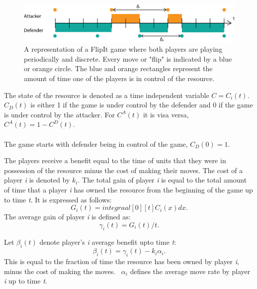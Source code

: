\begin{figure}[hbtp]
\centering
\includegraphics[scale=0.8]{Images/DefFlipit}
\caption{A representation of a FlipIt game where both players are playing periodically and discrete. Every move or "flip" is indicated by a blue or orange circle. The blue and orange rectangles represent the amount of time one of the players is in control of the resource.}
\label{fig:FLipItDefault}
\end{figure}


The state of the resource is denoted as a time independent variable $C=C_{i}(t)$. 
$C_{D}(t)$ is either 1 if the game is under control by the defender and 0 if the game is under control by the attacker. For $C^{A}(t)$ it is visa versa, $C^{A}(t)= 1 - C^{D}(t)$.\\ \\
The game starts with defender being in control of the game, $C_{D}(0)= 1$. 

The players receive a benefit equal to the time of units that they were in possession of the resource minus the cost of making their moves. The cost of a player \textit{i} is denoted by $k_{i}$. 
The total gain of player \textit{i} is equal to the total amount of time that a player \textit{i} has owned the resource from the beginning of the game up to time \textit{t}. It is expressed as follows:
\begin{equation}\label{first}
G_{i}(t) = integraal [0][t] C_{i}(x) dx.
\end{equation}
The average gain of player \textit{i} is defined as:
\begin{equation}\label{first}
\gamma_{i}(t) = G_{i}(t)/t.
\end{equation}

Let $\beta_{i}(t)$ denote player's \textit{i} average benefit upto time \textit{t}:
\begin{equation}\label{first}
\beta_{i}(t) = \gamma_{i}(t) - k_{i}\alpha_{i}.
\end{equation}
This is equal to the fraction of time the resource has been owned by player \textit{i}, minus the cost of making the moves. ~$ \alpha_{i}$ defines the average move rate by player \textit{i} up to time \textit{t}.
\\

